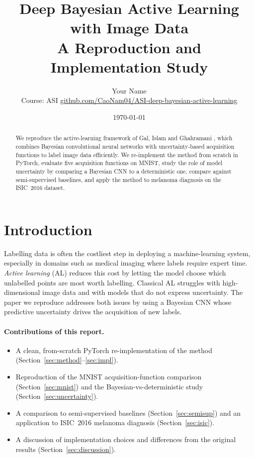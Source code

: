 \documentclass[11pt]{article}
\title{\textbf{Deep Bayesian Active Learning with Image Data}\\[4pt]
       \large A Reproduction and Implementation Study}
\author{Your Name \\ \small Course: ASI \quad\textbar\quad
        \href{https://github.com/CaoNam04/ASI-deep-bayesian-active-learning}%
        {github.com/CaoNam04/ASI-deep-bayesian-active-learning}}
\date{\today}
\begin{document}
\maketitle

\begin{abstract}
We reproduce the active-learning framework of Gal, Islam and Ghahramani
\cite{gal2017deepbal}, which combines Bayesian convolutional neural networks
with uncertainty-based acquisition functions to label image data efficiently.
We re-implement the method from scratch in PyTorch, evaluate five acquisition
functions on MNIST, study the role of model uncertainty by comparing a Bayesian
CNN to a deterministic one, compare against semi-supervised baselines, and apply
the method to melanoma diagnosis on the ISIC~2016 dataset. %
\end{abstract}

\section{Introduction}
\label{sec:intro}
Labelling data is often the costliest step in deploying a machine-learning
system, especially in domains such as medical imaging where labels require
expert time. \emph{Active learning} (AL) reduces this cost by letting the model
choose which unlabelled points are most worth labelling. Classical AL struggles
with high-dimensional image data and with models that do not express
uncertainty. The paper we reproduce addresses both issues by using a Bayesian
CNN whose predictive uncertainty drives the acquisition of new labels.

\paragraph{Contributions of this report.}
\begin{itemize}
  \item A clean, from-scratch PyTorch re-implementation of the method
        (Section~\ref{sec:method}--\ref{sec:impl}).
  \item Reproduction of the MNIST acquisition-function comparison
        (Section~\ref{sec:mnist}) and the Bayesian-vs-deterministic study
        (Section~\ref{sec:uncertainty}).
  \item A comparison to semi-supervised baselines (Section~\ref{sec:semisup})
        and an application to ISIC~2016 melanoma diagnosis
        (Section~\ref{sec:isic}).
  \item A discussion of implementation choices and differences from the original
        results (Section~\ref{sec:discussion}).
\end{itemize}
\end{document}
